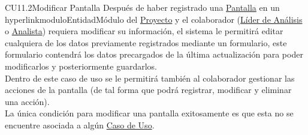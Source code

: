 	\begin{UseCase}{CU11.2}{Modificar Pantalla}{
		Después de haber registrado una \hyperlink{pantalla}{Pantalla} en un hyperlink{moduloEntidad}{Módulo} del \hyperlink{proyectoEntidad}{Proyecto} y el colaborador (\hyperlink{jefe}{Líder de Análisis} o \hyperlink{analista}{Analista}) requiera modificar su información, el sistema le permitirá editar cualquiera de los datos previamente registrados mediante un formulario, este formulario contendrá los datos precargados de la última actualización para poder modificarlos y posteriormente guardarlos.\\
		Dentro de este caso de uso se le permitirá también al colaborador gestionar las acciones de la pantalla (de tal forma que podrá registrar, modificar y eliminar una acción).\\
		
		La única condición para modificar una pantalla exitosamente es que esta no se encuentre asociada a algún \hyperlink{casoUso}{Caso de Uso}.
	}
		

\end{UseCase}

